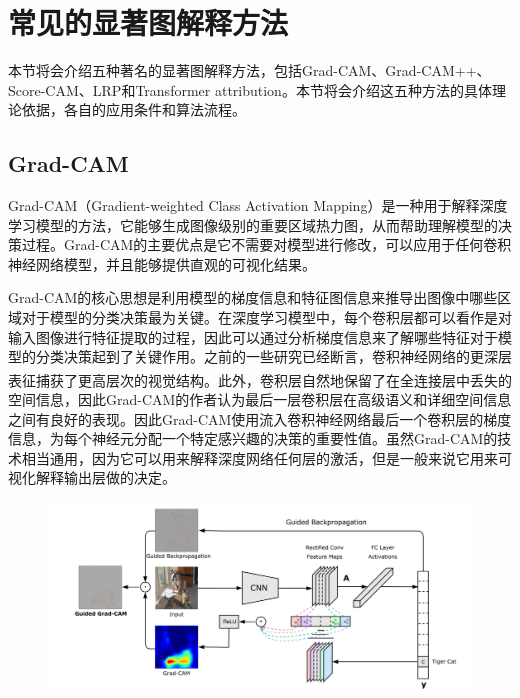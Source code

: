 \section{常见的显著图解释方法}
本节将会介绍五种著名的显著图解释方法，包括Grad-CAM、Grad-CAM++、Score-CAM、LRP和Transformer attribution。本节将会介绍这五种方法的具体理论依据，各自的应用条件和算法流程。 
\subsection{Grad-CAM}\label{sub:gradcam}
Grad-CAM（Gradient-weighted Class Activation Mapping）是一种用于解释深度学习模型的方法，它能够生成图像级别的重要区域热力图，从而帮助理解模型的决策过程。Grad-CAM的主要优点是它不需要对模型进行修改，可以应用于任何卷积神经网络模型，并且能够提供直观的可视化结果。

Grad-CAM的核心思想是利用模型的梯度信息和特征图信息来推导出图像中哪些区域对于模型的分类决策最为关键。在深度学习模型中，每个卷积层都可以看作是对输入图像进行特征提取的过程，因此可以通过分析梯度信息来了解哪些特征对于模型的分类决策起到了关键作用。之前的一些研究已经断言，卷积神经网络的更深层表征捕获了更高层次的视觉结构\textsuperscript{\cite{bengio2013representation}\cite{mahendran2016visualizing  }}。此外，卷积层自然地保留了在全连接层中丢失的空间信息，因此Grad-CAM的作者认为最后一层卷积层在高级语义和详细空间信息之间有良好的表现。因此Grad-CAM使用流入卷积神经网络最后一个卷积层的梯度信息，为每个神经元分配一个特定感兴趣的决策的重要性值。虽然Grad-CAM的技术相当通用，因为它可以用来解释深度网络任何层的激活，但是一般来说它用来可视化解释输出层做的决定。

\begin{figure}[h]
	\centering 
	\includegraphics[width=15cm]{fig/ch2/gradcam1.png}
	\label{fig:gradcam1}
\end{figure}

